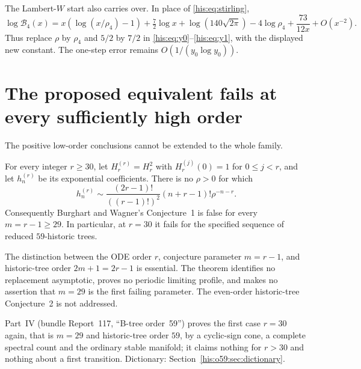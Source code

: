 The Lambert-$W$ start also carries over. In place of \eqref{his:eq:stirling},
\[
 \log\mathcal B_4(x)=x(\log(x/\rho_4)-1)+\tfrac72\log x
 +\log(140\sqrt{2\pi})-4\log\rho_4+\frac{73}{12x}+O(x^{-2}).
\]
Thus replace $\rho$ by $\rho_4$ and $5/2$ by $7/2$ in \eqref{his:eq:y0}--\eqref{his:eq:y1}, with the displayed new constant. The one-step error remains $O(1/(y_0\log y_0))$.

\section{The proposed equivalent fails at every sufficiently high order}\label{his:sec:obstruction}
The positive low-order conclusions cannot be extended to the whole family.
\begin{theorem}\label{his:thm:counterexample}
For every integer $r\ge30$, let $H_r^{(r)}=H_r^2$ with $H_r^{(j)}(0)=1$ for $0\le j<r$, and let $h_n^{(r)}$ be its exponential coefficients. There is no $\rho>0$ for which
\begin{equation}\label{his:eq:false-equivalent}
 h_n^{(r)}\sim\frac{(2r-1)!}{((r-1)!)^2}(n+r-1)!\rho^{-n-r}.
\end{equation}
Consequently Burghart and Wagner's Conjecture~1 is false for every $m=r-1\ge29$. In particular, at $r=30$ it fails for the specified sequence of reduced $59$-historic trees.
\end{theorem}
The distinction between the ODE order $r$, conjecture parameter $m=r-1$, and historic-tree order $2m+1=2r-1$ is essential. The theorem identifies no replacement asymptotic, proves no periodic limiting profile, and makes no assertion that $m=29$ is the first failing parameter. The even-order historic-tree Conjecture~2 is not addressed.
\begin{writenote}
Part~IV (bundle Report~117, ``B-tree order~59'') proves the first case $r=30$ again, that is $m=29$ and historic-tree order $59$, by a cyclic-sign cone, a complete spectral count and the ordinary stable manifold; it claims nothing for $r>30$ and nothing about a first transition. Dictionary: Section~\ref{his:o59:sec:dictionary}.
\end{writenote}


